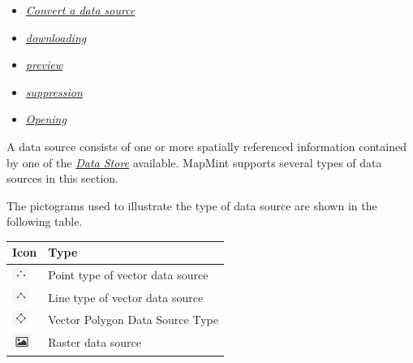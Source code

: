 \documentclass[letterpaper,10pt,english]{sphinxmanual}
\begin{document}
{\begin{minipage}{0.95\linewidth}
\begin{itemize}
\begin{itemize}
\begin{itemize}
\item {} 
\label{data/datasources:id16}{\hyperref[data/datasources:convertir-une-source-de-donnees]{\emph{Convert a data source}}}

\item {} 
\label{data/datasources:id17}{\hyperref[data/datasources:telechargement]{\emph{downloading}}}

\item {} 
\label{data/datasources:id18}{\hyperref[data/datasources:previsualisation]{\emph{preview}}}

\item {} 
\label{data/datasources:id19}{\hyperref[data/datasources:suppression]{\emph{suppression}}}

\item {} 
\label{data/datasources:id20}{\hyperref[data/datasources:ouverture]{\emph{Opening}}}

\end{itemize}

\end{itemize}

\end{itemize}
\end{minipage}}
\begin{center}\setlength{\fboxsep}{5pt}\end{center}

A data source consists of one or more spatially referenced information contained by one of the {\hyperref[data/datastores::doc]{\emph{\emph{Data Store}}}} available. MapMint supports several types of data sources in this section.

The pictograms used to illustrate the type of data source are shown in the following table.

\begin{tabulary}{\linewidth}{|L|L|}
\hline

\textbf{Icon}
 & 
\textbf{Type}
\\
\hline
\includegraphics{data-vector-point-icon.png}
 & 
Point type of vector data source
\\
\hline
\includegraphics{data-vector-line-icon.png}
 & 
Line type of vector data source
\\
\hline
\includegraphics{data-vector-polygon-icon.png}
 & 
Vector Polygon Data Source Type
\\
\hline
\includegraphics{data-raster-icon.png}
 & 
Raster data source
\\
\hline\end{tabulary}
\end{document}
